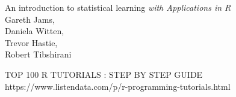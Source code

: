 \documentclass{report} %
\begin{document}
\printindex %
\begin{thebibliography}{9} %
    An introduction to statistical learning \emph{with Applications in R} \\
    Gareth Jams, \\
    Daniela Witten, \\
    Trevor Hastie, \\
    Robert Tibshirani

    TOP 100 R TUTORIALS : STEP BY STEP GUIDE \\
    https://www.listendata.com/p/r-programming-tutorials.html

\end{thebibliography}

\end{document}
